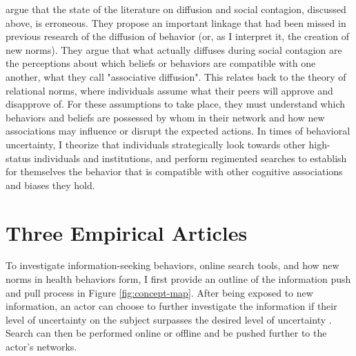 \citet{goldbergSocialContagionAssociative2018} argue that the state of the
literature on diffusion and social contagion, discussed above, is erroneous.
They propose an important linkage that had been missed in previous research of
the diffusion of behavior (or, as I interpret it, the creation of new norms).
They argue that what actually diffuses during social contagion are the
perceptions about which beliefs or behaviors are compatible with one another,
what they call "associative diffusion". 
This relates back to the theory of relational norms, where individuals assume
what their peers will approve and disapprove of. For these assumptions 
to take place, they must understand which behaviors and beliefs
are possessed by whom in their network and how new associations may influence
or disrupt the expected actions. In times of behavioral uncertainty, I
theorize that individuals strategically look towards other high-status
individuals and institutions, and perform regimented searches to establish for
themselves the behavior that is compatible with other cognitive associations
and biases they hold.

\section{Three Empirical Articles}

To investigate information-seeking behaviors, online search tools, and how
new norms in health behaviors form, I first provide an outline of the 
information push and pull process in Figure \ref{fig:concept-map}. After 
being exposed to new information, an actor can choose to further investigate
the information if their level of uncertainty on the subject surpasses
the desired level of uncertainty \citep{brashersCommunicationUncertaintyManagement2001}. 
Search can then be performed online or offline and be pushed further to the actor's 
networks. 


